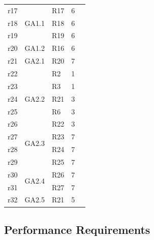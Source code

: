 \begin{table}[h!]
\begin{tabular}{|l|l|l|l|l|}
			r17					&\multirow{3}{*}{GA1.1}	&   	R17 								&  6										&\\\cline{3-5}\cline{0-0}
			r18					&											&   	R18 								&  6										&\\\cline{3-5}\cline{0-0}
			r19					&											&   	R19 								&  6										&\\\cline{3-5}\cline{0-0} \hline
											
 			r20					&\multirow{1}{*}{GA1.2}	&   	R16 								&  6										&\\\cline{3-5}\cline{0-0} \hline
 	
 			r21					&\multirow{1}{*}{GA2.1}	&   	R20 								&  7										&\\\cline{3-5}\cline{0-0} \hline
 	
 			r22					&\multirow{5}{*}{GA2.2}	&   	R2 								&  1										&\\\cline{3-5}\cline{0-0} 
 			r23					&											& 		R3 								&  1										&\\\cline{3-5}\cline{0-0} 
 			r24					&											&		R21 								&  3										&\\\cline{3-5}\cline{0-0}
 			r25					&											&		R6 								&  3										&\\\cline{3-5}\cline{0-0}
 			r26					&											&		R22 								&  3										&\\\cline{3-5}\cline{0-0}\hline
 									
 			r27					&\multirow{2}{*}{GA2.3}	&  	R23 								&  7										&\\\cline{3-5}\cline{0-0}
 			r28					&											&  	R24 								&  7										&\\\cline{3-5}\cline{0-0} 
 			r29					&											&  	R25 								&  7										&\\\cline{3-5}\cline{0-0} \hline
 											
 			r30					&\multirow{2}{*}{GA2.4}	&  	R26 								&  7										&\\\cline{3-5}\cline{0-0}
 			r31					&											&  	R27 								&  7										&\\\cline{3-5}\cline{0-0} \hline
 											
 			r32					&\multirow{1}{*}{GA2.5}	&  	R21 								&  5										&\\\cline{3-5}\cline{0-0}\hline
	\end{tabular}
	\end{table}
	
	\newpage
	
\subsection{Performance Requirements}

